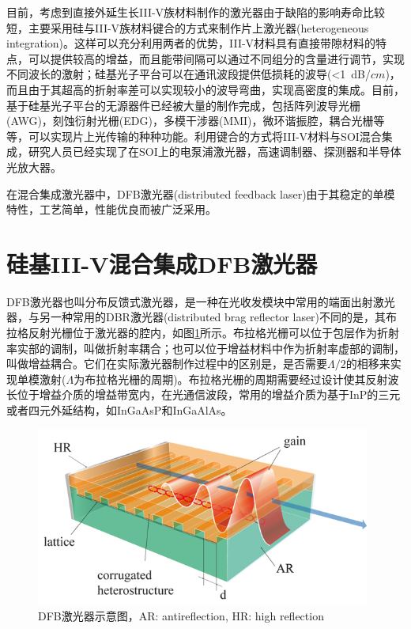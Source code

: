 目前，考虑到直接外延生长III-V族材料制作的激光器由于缺陷的影响寿命比较短\cite{liu2015reliability,sun2016room}，主要采用硅与III-V族材料键合的方式来制作片上激光器(heterogeneous integration)。这样可以充分利用两者的优势，III-V材料具有直接带隙材料的特点，可以提供较高的增益，而且能带间隔可以通过不同组分的含量进行调节，实现不同波长的激射；硅基光子平台可以在通讯波段提供低损耗的波导(<1~dB/$cm$)，而且由于其超高的折射率差可以实现较小的波导弯曲，实现高密度的集成。目前，基于硅基光子平台的无源器件已经被大量的制作完成，包括阵列波导光栅(AWG)，刻蚀衍射光栅(EDG)，多模干涉器(MMI)，微环谐振腔，耦合光栅等等\cite{asghari2011silicon,jalali2006silicon}，可以实现片上光传输的种种功能。利用键合的方式将III-V材料与SOI混合集成，研究人员已经实现了在SOI上的电泵浦激光器，高速调制器、探测器和半导体光放大器\cite{liang2010hybrid,roelkens2010iii,liang2010recent,duan2014hybrid}。

在混合集成激光器中，DFB激光器(distributed feedback laser)由于其稳定的单模特性，工艺简单，性能优良而被广泛采用。

\section{硅基III-V混合集成DFB激光器}

DFB激光器也叫分布反馈式激光器，是一种在光收发模块中常用的端面出射激光器，与另一种常用的DBR激光器(distributed brag reflector laser)不同的是，其布拉格反射光栅位于激光器的腔内，如图\ref{intro_dfb_laser}所示。布拉格光栅可以位于包层作为折射率实部的调制，叫做折射率耦合；也可以位于增益材料中作为折射率虚部的调制，叫做增益耦合。它们在实际激光器制作过程中的区别是，是否需要$\Lambda/2$的相移来实现单模激射($\Lambda$为布拉格光栅的周期)。布拉格光栅的周期需要经过设计使其反射波长位于增益介质的增益带宽内，在光通信波段，常用的增益介质为基于InP的三元或者四元外延结构，如InGaAsP和InGaAlAs。

\begin{figure}[htb]
	\centering
	\includegraphics[width=11cm]{./Pictures/intro_dfb_laser.jpg}
	\captionsetup{justification=centering}
	\caption{DFB激光器示意图，AR: antireflection, HR: high reflection}
	\label{intro_dfb_laser}
\end{figure}


